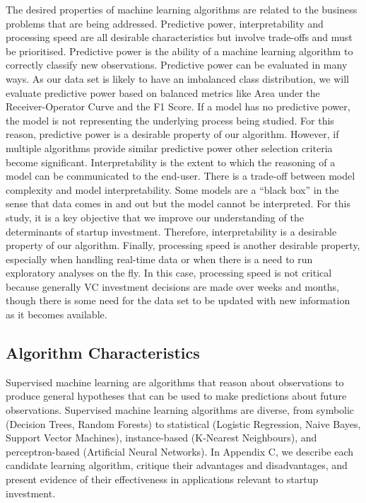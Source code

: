 \documentclass[../thesis/thesis.tex]{subfiles}
\begin{document}
The desired properties of machine learning algorithms are related to the business problems that are being addressed. Predictive power, interpretability and processing speed are all desirable characteristics but involve trade-offs and must be prioritised. Predictive power is the ability of a machine learning algorithm to correctly classify new observations. Predictive power can be evaluated in many ways. As our data set is likely to have an imbalanced class distribution, we will evaluate predictive power based on balanced metrics like Area under the Receiver-Operator Curve and the F1 Score. If a model has no predictive power, the model is not representing the underlying process being studied. For this reason, predictive power is a desirable property of our algorithm. However, if multiple algorithms provide similar predictive power other selection criteria become significant. Interpretability is the extent to which the reasoning of a model can be communicated to the end-user. There is a trade-off between model complexity and model interpretability. Some models are a ``black box'' in the sense that data comes in and out but the model cannot be interpreted. For this study, it is a key objective that we improve our understanding of the determinants of startup investment. Therefore, interpretability is a desirable property of our algorithm. Finally, processing speed is another desirable property, especially when handling real-time data or when there is a need to run exploratory analyses on the fly. In this case, processing speed is not critical because generally VC investment decisions are made over weeks and months, though there is some need for the data set to be updated with new information as it becomes available.

\subsection{Algorithm Characteristics}

Supervised machine learning are algorithms that reason about observations to produce general hypotheses that can be used to make predictions about future observations. Supervised machine learning algorithms are diverse, from symbolic (Decision Trees, Random Forests) to statistical (Logistic Regression, Naive Bayes, Support Vector Machines), instance-based (K-Nearest Neighbours), and perceptron-based (Artificial Neural Networks). In Appendix C, we describe each candidate learning algorithm, critique their advantages and disadvantages, and present evidence of their effectiveness in applications relevant to startup investment.
\end{document}
